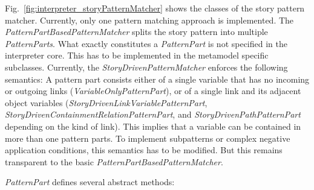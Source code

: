 Fig.~\ref{fig:interpreter_storyPatternMatcher} shows the classes of the story pattern matcher. Currently, only one pattern matching approach is implemented. The \emph{PatternPartBasedPatternMatcher} splits the story pattern into multiple \emph{PatternParts}. What exactly constitutes a \emph{PatternPart} is not specified in the interpreter core. This has to be implemented in the metamodel specific subclasses. Currently, the \emph{StoryDrivenPatternMatcher} enforces the following semantics: A pattern part consists either of a single variable that has no incoming or outgoing links (\emph{VariableOnlyPatternPart}), or of a single link and its adjacent object variables (\emph{StoryDrivenLinkVariablePatternPart}, \emph{StoryDrivenContainmentRelationPatternPart}, and \emph{StoryDrivenPathPatternPart} depending on the kind of link). This implies that a variable can be contained in more than one pattern parts. To implement subpatterns or complex negative application conditions, this semantics has to be modified. But this remains transparent to the basic \emph{PatternPartBasedPatternMatcher}.

\emph{PatternPart} defines several abstract methods:

